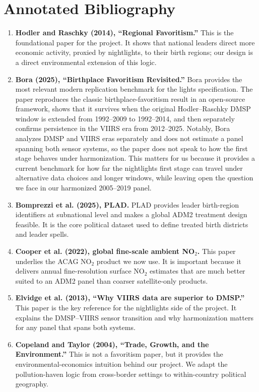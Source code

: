 \documentclass[11pt]{article}
\begin{document}
\section{Annotated Bibliography}
\begin{enumerate}[leftmargin=*, itemsep=0.5em]
    \item \textbf{Hodler and Raschky (2014), ``Regional Favoritism.''} This is the foundational paper for the project. It shows that national leaders direct more economic activity, proxied by nightlights, to their birth regions; our design is a direct environmental extension of this logic.

    \item \textbf{Bora (2025), ``Birthplace Favoritism Revisited.''} Bora provides the most relevant modern replication benchmark for the lights specification. The paper reproduces the classic birthplace-favoritism result in an open-source framework, shows that it survives when the original Hodler--Raschky DMSP window is extended from 1992--2009 to 1992--2014, and then separately confirms persistence in the VIIRS era from 2012--2025. Notably, Bora analyzes DMSP and VIIRS eras separately and does not estimate a panel spanning both sensor systems, so the paper does not speak to how the first stage behaves under harmonization. This matters for us because it provides a current benchmark for how far the nightlights first stage can travel under alternative data choices and longer windows, while leaving open the question we face in our harmonized 2005--2019 panel.

    \item \textbf{Bomprezzi et al. (2025), PLAD.} PLAD provides leader birth-region identifiers at subnational level and makes a global ADM2 treatment design feasible. It is the core political dataset used to define treated birth districts and leader spells.

    \item \textbf{Cooper et al. (2022), global fine-scale ambient NO$_2$.} This paper underlies the ACAG NO$_2$ product we now use. It is important because it delivers annual fine-resolution surface NO$_2$ estimates that are much better suited to an ADM2 panel than coarser satellite-only products.

    \item \textbf{Elvidge et al. (2013), ``Why VIIRS data are superior to DMSP.''} This paper is the key reference for the nightlights side of the project. It explains the DMSP--VIIRS sensor transition and why harmonization matters for any panel that spans both systems.

    \item \textbf{Copeland and Taylor (2004), ``Trade, Growth, and the Environment.''} This is not a favoritism paper, but it provides the environmental-economics intuition behind our project. We adapt the pollution-haven logic from cross-border settings to within-country political geography.
\end{enumerate}
\end{document}
